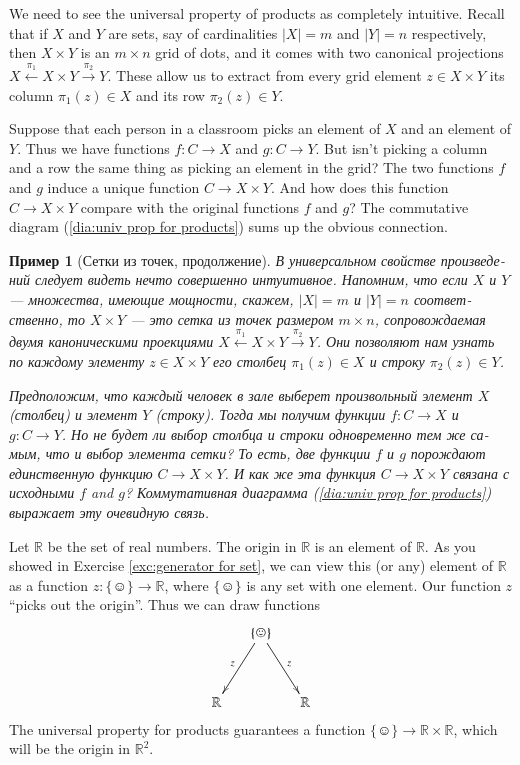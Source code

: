 \documentclass[a4paper]{book}
\def\RR{{\mathbb R}}
\def\singleton{\{\smiley\}}
\def\to{\rightarrow}
\def\taking{\colon}
\newcommand{\To}[1]{\xrightarrow{#1}}
\newcommand{\From}[1]{\xleftarrow{#1}}
\theoremstyle{myth}
\newtheorem{exampleENG}[envENG]{\begin{english}Example\end{english}}
\newtheorem{exampleRUS}[envRUS]{Пример}
\begin{document}
\begin{russian}
\begin{exampleENG}\label{ex:grid2}
We need to see the universal property of products as completely intuitive. Recall that if $X$ and $Y$ are sets, say of cardinalities $|X|=m$ and $|Y|=n$ respectively, then $X\times Y$ is an $m\times n$ grid of dots, and it comes with two canonical projections $X\From{\pi_1}X\times Y\To{\pi_2}Y$. These allow us to extract from every grid element $z\in X\times Y$ its column $\pi_1(z)\in X$ and its row $\pi_2(z)\in Y$.

Suppose that each person in a classroom picks an element of $X$ and an element of $Y$. Thus we have functions $f\taking C\to X$ and $g\taking C\to Y$. But isn't picking a column and a row the same thing as picking an element in the grid? The two functions $f$ and $g$ induce a unique function $C\to X\times Y$. And how does this function $C\to X\times Y$ compare with the original functions $f$ and $g$? The commutative diagram (\ref{dia:univ prop for products}) sums up the obvious connection. 
\end{exampleENG}

\begin{exampleRUS}[Сетки из точек, продолжение]\label{ex:grid2}
В универсальном свойстве произведений следует видеть нечто совершенно интуитивное. Напомним, что если $X$ и $Y$ — множества, имеющие мощности, скажем, $|X|=m$ и $|Y|=n$ соответственно, то $X\times Y$ — это сетка из точек размером $m\times n$, сопровождаемая двумя каноническими проекциями $X\From{\pi_1}X\times Y\To{\pi_2}Y$. Они позволяют нам узнать по каждому элементу $z\in X\times Y$ его столбец $\pi_1(z)\in X$ и строку $\pi_2(z)\in Y$.

Предположим, что каждый человек в зале выберет произвольный элемент $X$ (столбец) и элемент $Y$ (строку). Тогда мы получим функции $f\taking C\to X$ и $g\taking C\to Y$. Но не будет ли выбор столбца и строки одновременно тем же самым, что и выбор элемента сетки? То есть, две функции $f$ и $g$ порождают единственную функцию $C\to X\times Y$. И как же эта функция $C\to X\times Y$ связана с исходными $f$ and $g$? Коммутативная диаграмма (\ref{dia:univ prop for products}) выражает эту очевидную связь. 
\end{exampleRUS}

\begin{exampleENG}
Let $\RR$ be the set of real numbers. The origin in $\RR$ is an element of $\RR$. As you showed in Exercise \ref{exc:generator for set}, we can view this (or any) element of $\RR$ as a function $z\taking\singleton\to\RR$, where $\singleton$ is any set with one element. Our function $z$ “picks out the origin”. Thus we can draw functions 
$$\xymatrix@=15pt{&\singleton\ar[ddr]^z\ar[ddl]_z\\\\\RR&&\RR}
$$
The universal property for products guarantees a function $\singleton\to\RR\times\RR$, which will be the origin in $\RR^2.$
\end{exampleENG}


\end{russian}
\end{document}

